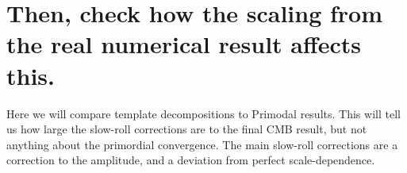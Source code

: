 \section{Then, check how the scaling from the real numerical result affects this.}
    Here we will compare template decompositions to Primodal results.
    This will tell us how large the slow-roll corrections are to the
    final CMB result, but not anything about the primordial convergence.
    The main slow-roll corrections are a correction to the amplitude,
    and a deviation from perfect scale-dependence.

